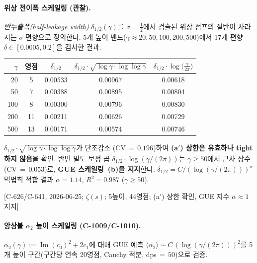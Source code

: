 \documentclass[11pt, a4paper]{article}
\theoremstyle{definition}
\theoremstyle{plain}
\begin{document}
\paragraph{위상 전이폭 스케일링 (관찰).}
\emph{반누출폭(half-leakage width)} $\delta_{1/2}(\gamma)$를
$\sigma=\tfrac12$에서 검출된 위상 점프의 절반이
사라지는 $\sigma$-편향으로 정의한다.
5개 높이 밴드($\gamma \approx 20, 50, 100, 200, 500$)에서
17개 편향 $\delta \in [0.0005, 0.2]$을 검사한 결과:

\smallskip
\begin{center}
\renewcommand{\arraystretch}{1.15}
\begin{tabular}{rcccc}
\toprule
$\gamma$ & 영점 & $\delta_{1/2}$ & $\delta_{1/2}\!\cdot\!\sqrt{\log\gamma\cdot\log\!\log\gamma}$ & $\delta_{1/2}\!\cdot\!\log\!\bigl(\tfrac{\gamma}{2\pi}\bigr)$ \\
\midrule
20  & 5  & 0.00533 & 0.00967 & 0.00618 \\
50  & 7  & 0.00388 & 0.00895 & 0.00804 \\
100 & 8  & 0.00300 & 0.00796 & 0.00830 \\
200 & 11 & 0.00211 & 0.00626 & 0.00729 \\
500 & 13 & 0.00171 & 0.00574 & 0.00746 \\
\bottomrule
\end{tabular}
\end{center}

\smallskip\noindent
$\delta_{1/2}\cdot\sqrt{\log\gamma\cdot\log\!\log\gamma}$가 단조감소
(CV$\,{=}\,0.196$)하여 \textbf{(a$'$) 상한은 유효하나 tight하지 않음}을 확인.
반면 밀도 보정 곱 $\delta_{1/2}\cdot\log(\gamma/(2\pi))$는
$\gamma \ge 50$에서 근사 상수(CV$\,{=}\,0.053$)로,
\textbf{GUE 스케일링~(b)을 지지}한다.
$\delta_{1/2} = C/(\log(\gamma/(2\pi)))^\alpha$ 멱법칙 적합 결과
$\alpha = 1.14$, $R^2 = 0.987$ ($\gamma\ge50$).

[C-626/C-641, 2026-06-25; $\zeta(s)$;
5높이, 44영점; (a$'$) 상한 확인, GUE 지수 $\alpha{\approx}1$ 지지]

\paragraph{앙상블 $\alpha_2$ 높이 스케일링 (C-1009/C-1010).}
$\alpha_2(\gamma) := \operatorname{Im}(c_0)^2 + 2c_1$에 대해
GUE 예측 $\langle\alpha_2\rangle \sim C\,(\log(\gamma/(2\pi)))^2$를
5개 높이 구간(구간당 연속 20영점, Cauchy 적분, dps$\,{=}\,50$)으로 검증.
\end{document}
